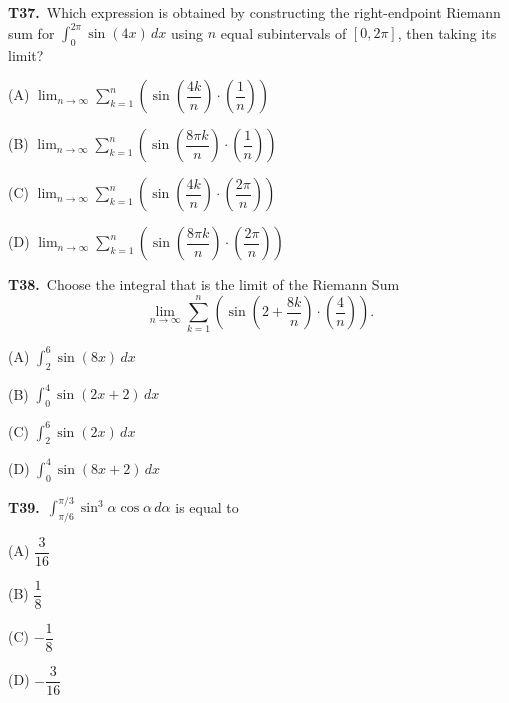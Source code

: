 \documentclass[11pt]{article}
\begin{document}
\bigskip\noindent\textbf{T37.}\ Which expression is obtained by constructing the right-endpoint Riemann sum for $\int_0^{2\pi}\sin(4x)\,dx$ using $n$ equal subintervals of $[0,2\pi]$, then taking its limit?
\begin{list}{}{\setlength{\leftmargin}{3em}\setlength{\labelwidth}{2.5em}\setlength{\itemsep}{0pt}\setlength{\topsep}{2pt}}
\item[(A)] $\displaystyle\lim_{n\to\infty}\sum_{k=1}^n \left(\sin\left(\dfrac{4k}{n}\right)\cdot\left(\dfrac{1}{n}\right)\right)$
\item[(B)] $\displaystyle\lim_{n\to\infty}\sum_{k=1}^n \left(\sin\left(\dfrac{8\pi k}{n}\right)\cdot\left(\dfrac{1}{n}\right)\right)$
\item[(C)] $\displaystyle\lim_{n\to\infty}\sum_{k=1}^n \left(\sin\left(\dfrac{4k}{n}\right)\cdot\left(\dfrac{2\pi}{n}\right)\right)$
\item[(D)] $\displaystyle\lim_{n\to\infty}\sum_{k=1}^n \left(\sin\left(\dfrac{8\pi k}{n}\right)\cdot\left(\dfrac{2\pi}{n}\right)\right)$
\end{list}

\bigskip\noindent\textbf{T38.}\ Choose the integral that is the limit of the Riemann Sum
\[
\lim_{n\to\infty}\sum_{k=1}^n \left(\sin\left(2+\dfrac{8k}{n}\right)\cdot\left(\dfrac{4}{n}\right)\right).
\]
\begin{list}{}{\setlength{\leftmargin}{3em}\setlength{\labelwidth}{2.5em}\setlength{\itemsep}{0pt}\setlength{\topsep}{2pt}}
\item[(A)] $\displaystyle\int_{2}^{6} \sin(8x)\,dx$
\item[(B)] $\displaystyle\int_{0}^{4} \sin(2x+2)\,dx$
\item[(C)] $\displaystyle\int_{2}^{6} \sin(2x)\,dx$
\item[(D)] $\displaystyle\int_{0}^{4} \sin(8x+2)\,dx$
\end{list}

\bigskip\noindent\textbf{T39.}\ $\displaystyle\int_{\pi/6}^{\pi/3} \sin^3\alpha\cos\alpha\,d\alpha$ is equal to
\begin{list}{}{\setlength{\leftmargin}{3em}\setlength{\labelwidth}{2.5em}\setlength{\itemsep}{0pt}\setlength{\topsep}{2pt}}
\item[(A)] $\dfrac{3}{16}$
\item[(B)] $\dfrac{1}{8}$
\item[(C)] $-\dfrac{1}{8}$
\item[(D)] $-\dfrac{3}{16}$
\end{list}
\end{document}

